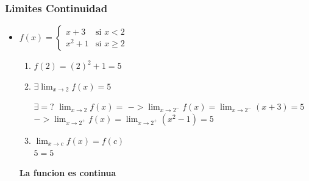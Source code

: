 \documentclass[stu, 12pt, letterpaper, donotrepeattitle, floatsintext, natbib]{apa7}
\begin{document}
    \newpage

    \subsubsection{Limites Continuidad}
    \begin{itemize}
        \item $f(x) = \begin{cases}
                          x + 3 & \text{si } x < 2 \\
                          x^2 + 1 & \text{si } x \geq 2
        \end{cases}$\\[0.5cm]
        \begin{enumerate}
            \item $f(2) = (2)^2 + 1 = 5$

            \item $\exists \displaystyle\lim_{x \to 2} f(x) = 5$\\[0.5cm]
            \begin{paracol}{3}
                $\exists = ? $
                \switchcolumn
                $\displaystyle\lim_{x \to 2} f(x)=$
                \switchcolumn
                $-> \displaystyle\lim_{x \to 2^-} f(x) = \displaystyle\lim_{x\to2^-} (x+3) = 5$\\[0.5cm]
                $-> \displaystyle\lim_{x \to 2^+} f(x) = \displaystyle\lim_{x\to2^+} (x^2-1) = 5$\\[0.5cm]
            \end{paracol}

            \item $\displaystyle\lim_{x\to c} f(x) = f(c)$\\[0.5cm]
            $5=5$
        \end{enumerate}
        \textbf{La funcion es continua}
    \end{itemize}

    \newpage
\end{document}
